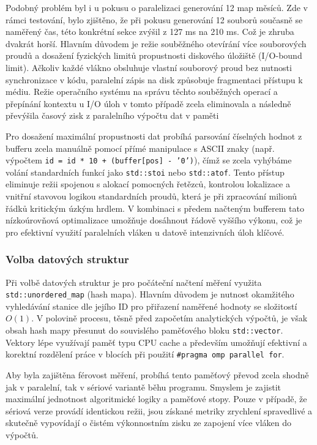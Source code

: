 \documentclass[10pt, a4paper]{report}
\begin{document}
	Podobný problém byl i u pokusu o paralelizaci generování 12 map měsíců. Zde v rámci testování, bylo zjištěno, že při pokusu generování 12 souborů současně se naměřený čas, této konkrétní sekce zvýšil z 127 ms na 210 ms. Což je zhruba dvakrát horší. Hlavním důvodem je režie souběžného otevírání více souborových proudů a dosažení fyzických limitů propustnosti diskového úložiště (I/O-bound limit). Ačkoliv každé vlákno obsluhuje vlastní souborový proud bez nutnosti synchronizace v kódu, paralelní zápis na disk způsobuje fragmentaci přístupu k médiu. Režie operačního systému na správu těchto souběžných operací a přepínání kontextu u I/O úloh v tomto případě zcela eliminovala a následně převýšila časový zisk z paralelního výpočtu dat v paměti
	
	Pro dosažení maximální propustnosti dat probíhá parsování číselných hodnot z bufferu zcela manuálně pomocí přímé manipulace s ASCII znaky (např. výpočtem \texttt{id = id * 10 + (buffer[pos] - '0')}), čímž se zcela vyhýbáme volání standardních funkcí jako \texttt{std::stoi} nebo \texttt{std::atof}. Tento přístup eliminuje režii spojenou s alokací pomocných řetězců, kontrolou lokalizace a vnitřní stavovou logikou standardních proudů, která je při zpracování milionů řádků kritickým úzkým hrdlem. V kombinaci s předem načteným bufferem tato nízkoúrovňová optimalizace umožňuje dosáhnout řádově vyššího výkonu, což je pro efektivní využití paralelních vláken u datově intenzivních úloh klíčové.
	
	\subsubsection{Volba datových struktur}
	
	Při volbě datových struktur je pro počáteční načtení měření využita \texttt{std::unordered\_map} (hash mapa). Hlavním důvodem je nutnost okamžitého vyhledávání stanice dle jejího ID pro přiřazení naměřené hodnoty se složitostí $O(1)$. V polovině procesu, těsně před započetím analytických výpočtů, je však obsah hash mapy přesunut do souvislého paměťového bloku \texttt{std::vector}. Vektory lépe využívají paměť typu CPU cache a především umožňují efektivní a korektní rozdělení práce v blocích při použití \texttt{\#pragma omp parallel for}.
	
	Aby byla zajištěna férovost měření, probíhá tento paměťový převod zcela shodně jak v paralelní, tak v sériové variantě běhu programu. Smyslem je zajistit maximální jednotnost algoritmické logiky a paměťové stopy. Pouze v případě, že sériová verze provádí identickou režii, jsou získané metriky zrychlení spravedlivé a skutečně vypovídají o čistém výkonnostním zisku ze zapojení více vláken do výpočtů.
	
\end{document}
